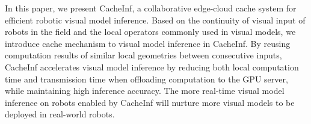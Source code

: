 In this paper, we present CacheInf, a collaborative edge-cloud cache system for efficient robotic visual model inference.
Based on the continuity of visual input of robots in the field and the local operators commonly used in visual models, we introduce cache mechanism to visual model inference in CacheInf.
By reusing computation results of similar local geometries between consecutive inputs, CacheInf accelerates visual model inference by reducing both local computation time and transmission time when offloading computation to the GPU server, while maintaining high inference accuracy.
The more real-time visual model inference on robots enabled by CacheInf will nurture more visual models to be deployed in real-world robots.